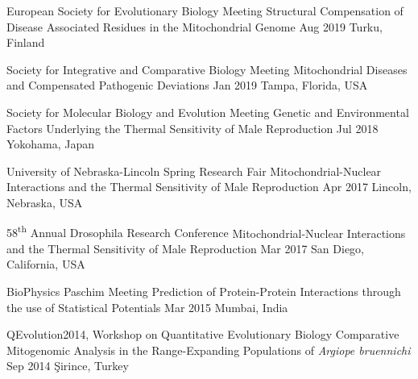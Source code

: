 \begin{cventries}
  \cvpresentation
    {European Society for Evolutionary Biology Meeting} %
    {Structural Compensation of Disease Associated Residues in the Mitochondrial Genome} %
    {Aug 2019} %
    {Turku, Finland} %
    
  \cvpresentation
    {Society for Integrative and Comparative Biology Meeting}
    {Mitochondrial Diseases and Compensated Pathogenic Deviations}
    {Jan 2019}
    {Tampa, Florida, USA}
    
  \cvpresentation
    {Society for Molecular Biology and Evolution Meeting}
    {Genetic and Environmental Factors Underlying the Thermal Sensitivity of Male Reproduction}
    {Jul 2018}
    {Yokohama, Japan}
    
  \cvpresentation
    {University of Nebraska-Lincoln Spring Research Fair}
    {Mitochondrial-Nuclear Interactions and the Thermal Sensitivity of Male Reproduction}
    {Apr 2017}
    {Lincoln, Nebraska, USA}
    
  \cvpresentation
    {58\textsuperscript{th} Annual Drosophila Research Conference}
    {Mitochondrial-Nuclear Interactions and the Thermal Sensitivity of Male Reproduction}
    {Mar 2017}
    {San Diego, California, USA}
    
   \cvpresentation
    {BioPhysics Paschim Meeting}
    {Prediction of Protein-Protein Interactions through the use of Statistical Potentials}
    {Mar 2015}
    {Mumbai, India}
    
  \cvpresentation
    {QEvolution2014, Workshop on Quantitative Evolutionary Biology}
    {Comparative Mitogenomic Analysis in the Range-Expanding Populations of \textit{Argiope bruennichi}}
    {Sep 2014}
    {\c{S}irince, Turkey}        
\end{cventries}
